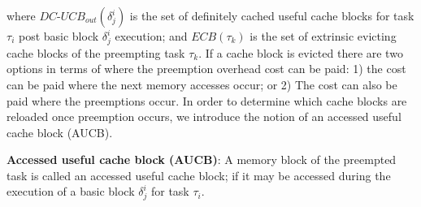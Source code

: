 \noindent where \begin{math}\textit{DC-UCB}_{out}(\delta_{j}^{i})\end{math} is the set of definitely cached useful cache blocks for task \begin{math}\tau_{i}\end{math} post basic block \begin{math}\delta_{j}^{i}\end{math} execution; and \begin{math}\textit{ECB}(\tau_{k})\end{math} is the set of extrinsic evicting cache blocks of the preempting task \begin{math}\tau_{k}\end{math}.
\newline
\newline
If a cache block is evicted there are two options in terms of where the preemption overhead cost can be paid: 1) the cost can be paid where the next memory accesses occur; or 2) The cost can also be paid where the preemptions occur.  In order to determine which cache blocks are reloaded once preemption occurs, we introduce the notion of an accessed useful cache block (AUCB).

\begin{definition}
\textbf{Accessed useful cache block (AUCB)}: A memory block of the preempted task is called an accessed useful cache block; if it may be accessed during the execution of a basic block \begin{math}\delta_{j}^{i}\end{math} for task \begin{math}\tau_{i}\end{math}.
\end{definition}

